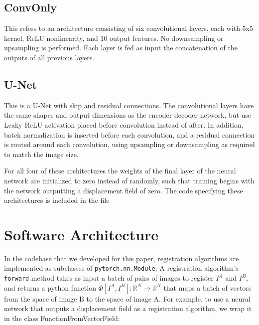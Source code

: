 \documentclass[10pt,onecolumn,letterpaper]{article} %
\begin{document}
\subsection{ConvOnly} This refers to an architecture consisting of six convolutional layers, each with 5x5 kernel, ReLU nonlinearity,  and 10 output features. No downsampling or upsampling is performed. Each layer is fed as input the concatenation of the outputs of all previous layers. \\ 
\subsection{U-Net} This is a U-Net with skip and residual connections. The convolutional layers have the same shapes and output dimensions as the encoder decoder network, but use Leaky ReLU activation placed before convolution instead of after. In addition, batch normalization is inserted before each convolution, and a residual connection is routed around each convolution, using upsampling or downsampling as required to match the image size. \par

For all four of these architectures the weights of the final layer of the neural network are initialized to zero instead of randomly, such that training begins with the network outputting a displacement field of zero. The code specifying these architectures is included in the file 


\section{Software Architecture}
 In the codebase that we developed for this paper, registration algorithms are implemented as subclasses of \verb|pytorch.nn.Module|. A registration algorithm's \verb|forward| method takes as input a batch of pairs of images to register $I^A$ and $I^B$, and returns a python function $\Phi[I^A, I^B]:\mathbb{R}^N \rightarrow \mathbb{R}^N$ that maps a batch of vectors from the space of image B to the space of image A. For example, to use a neural network that outputs a displacement field as a registration algorithm, we wrap it in the class FunctionFromVectorField:
\end{document}
